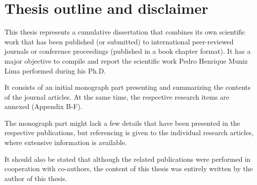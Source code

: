 \chapter{Thesis outline and disclaimer}

{\selectfont
This thesis represents a cumulative dissertation that combines its own scientific work that has been published (or submitted) to international peer-reviewed journals or conference proceedings (published in a book chapter format). It has a major objective to compile and report the scientific work Pedro Henrique Muniz Lima performed during his Ph.D. \par

It consists of an initial monograph part presenting and summarizing the contents of the journal articles. At the same time, the respective research items are annexed (Appendix B-F).\par

The monograph part might lack a few details that have been presented in the respective publications, but referencing is given to the individual research articles, where extensive information is available.\par

It should also be stated that although the related publications were performed in cooperation with co-authors, the content of this thesis was entirely written by the author of this thesis.}

\newpage